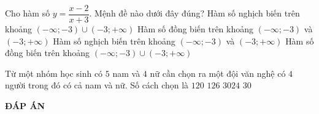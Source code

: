 \begin{ex}%
	Cho hàm số $y=\dfrac{x-2}{x+3}$. Mệnh đề nào dưới đây đúng?
	\choice
	{Hàm số nghịch biến trên khoảng $(-\infty;-3)\cup (-3;+\infty) $}
	{\True Hàm số đồng biến trên khoảng $(-\infty;-3) $ và $(-3;+\infty)$}
	{Hàm số nghịch biến trên khoảng $(-\infty;-3)$ và $(-3;+\infty)$}
	{Hàm số đồng biến trên khoảng $(-\infty;-3)\cup (-3;+\infty) $}
\end{ex}
\begin{ex}%
	Từ một nhóm học sinh có $5$ nam và $4$ nữ cần chọn ra một đội văn nghệ có $4$ người trong đó có cả nam và nữ. Số cách chọn là
	\choice
	{\True $120 $}
	{$126 $}
	{$3024 $}
	{$30 $}
\end{ex}
\newpage
\begin{center}
	\textbf{ĐÁP ÁN}
\end{center}
\begin{multicols}{10}
	 
\end{multicols}